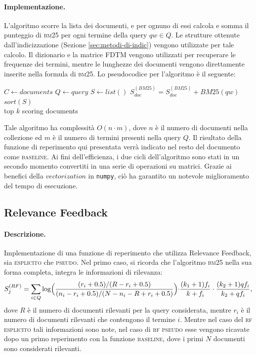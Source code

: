 \paragraph{\textbf{Implementazione.}}
L'algoritmo scorre la lista dei documenti, e per ognuno di essi calcola e somma il punteggio di \textsc{bm25} per ogni termine della query $qw \in Q$. Le strutture ottenute dall'indicizzazione (Sezione \ref{sec:metodi-di-indic}) vengono utilizzate per tale calcolo. Il dizionario e la matrice FDTM vengono utilizzati per recuperare le frequenze dei termini, mentre le lunghezze dei documenti vengono direttamente inserite nella formula di \textsc{bm25}. Lo pseudocodice per l'algoritmo \`e il seguente:
\begin{algorithmic}
\State $C \gets documents$
\State $Q \gets query$
\State $S \gets list()$
		\State $S^{(BM25)}_{doc} = S^{(BM25)}_{doc} + BM25(qw)$
	\EndFor
\EndFor
\State $sort(S)$\\
\Return top $k$ scoring documents
\end{algorithmic}
Tale algoritmo ha complessit\`a  $O(n \cdot m)$, dove $n$ \`e il numero di documenti nella collezione ed $m$ \`e il numero di termini presenti nella query $Q$. Il risultato della funzione di reperimento qui presentata verr\`a  indicato nel resto del documento come \textsc{baseline}. Ai fini dell'efficienza, i due cicli dell'algoritmo sono stati in un secondo momento convertiti in una serie di operazioni su matrici. Grazie ai benefici della $vectorization$ in \texttt{numpy}, ci\`o ha garantito un notevole miglioramento del tempo di esecuzione.
\subsection{Relevance Feedback}
\label{sec:relevance-feedback}

\paragraph{\textbf{Descrizione.}}
Implementazione di una funzione di reperimento che utilizza Relevance Feedback, sia \textsc{esplicito} che \textsc{pseudo}. Nel primo caso, si ricorda che l'algoritmo \textsc{bm25} nella sua forma completa, integra le informazioni di rilevanza:
\[ S^{(RF)}_j = \sum\limits_{i \in Q}\log\Bigl(\frac{(r_i+0.5)/(R-r_i+0.5)}{(n_i-r_i+0.5)/(N-n_i-R+r_i+0.5)}\Bigl)\cdot\frac{(k_1+1)f_i}{k+f_i}\cdot\frac{(k_2+1)qf_i}{k_2+qf_i}, \]
dove $R$ \`e il numero di documenti rilevanti per la query considerata, mentre $r_i$ \`e il numero di documenti rilevanti che contengono il termine $i$. Mentre nel caso del \textsc{rf esplicito} tali informazioni sono note, nel caso di \textsc{rf pseudo} esse vengono ricavate dopo un primo reperimento con la funzione \textsc{baseline}, dove i primi $N$ documenti sono considerati rilevanti.

